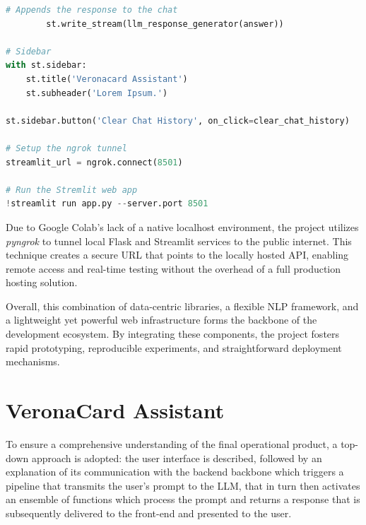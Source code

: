 \begin{center}
\begin{lstlisting}[language=Python, frame=single, caption=Flask API Internal Service]
        # Appends the response to the chat
        st.write_stream(llm_response_generator(answer))
    
# Sidebar
with st.sidebar:
    st.title('Veronacard Assistant')
    st.subheader('Lorem Ipsum.')
    
st.sidebar.button('Clear Chat History', on_click=clear_chat_history)

# Setup the ngrok tunnel
streamlit_url = ngrok.connect(8501)

# Run the Stremlit web app
!streamlit run app.py --server.port 8501
\end{lstlisting}
\end{center}

Due to Google Colab’s lack of a native localhost environment, the project utilizes \textit{pyngrok} to tunnel local Flask and Streamlit services to the public internet. This technique creates a secure URL that points to the locally hosted API, enabling remote access and real-time testing without the overhead of a full production hosting solution.

Overall, this combination of data-centric libraries, a flexible NLP framework, and a lightweight yet powerful web infrastructure forms the backbone of the development ecosystem. By integrating these components, the project fosters rapid prototyping, reproducible experiments, and straightforward deployment mechanisms.




\section{VeronaCard Assistant}
\label{sec:veronacard-assistant}

To ensure a comprehensive understanding of the final operational product, a top-down approach is adopted:  the user interface is described, followed by an explanation of its communication with the backend backbone which triggers a pipeline that transmits the user's prompt to the LLM, that in turn then activates an ensemble of functions which process the prompt and returns a response that is subsequently delivered to the front-end and presented to the user.

